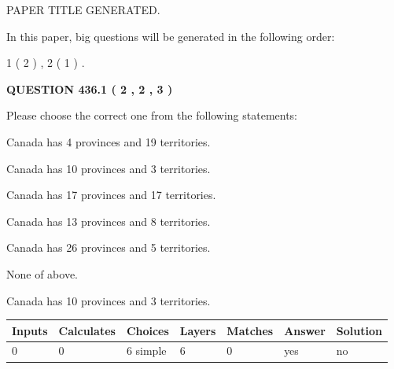 \documentclass[12pt]{article}
\begin{document}
   
\vspace{0.2in}
   
   
   
   
   
   
   
   
 \vspace{0.2in}
 
 
 
 
   
   
 PAPER TITLE GENERATED.
   
   
   
\vspace{0.2in}
   
In this paper, big questions will be generated in the following order: 
   
   
   1 ( 2 )
 ,
   2 ( 1 )
 .
  
\vspace{0.2in}
  
{\textbf{\Large{QUESTION
436.1 
 ( 2 , 2 , 3 )
}}}
  
  
Please choose the correct one from the following statements:
 
 
Canada has   4 provinces and  19 territories.
 
 
Canada has 10  provinces and 3 territories.
 
 
Canada has  17 provinces and  17 territories.
 
 
Canada has  13 provinces and  8 territories.
 
 
Canada has  26 provinces and  5 territories.
 
 
 None of above.
 
 
\noindent{}
 
 
Canada has 10  provinces and 3 territories.
 
 
\noindent{}
 
 
   
   
   
   
\noindent\begin{tabular}{|l|l|l|l|l|l|l|}
 \hline
Inputs & Calculates & Choices & Layers & Matches & Answer & Solution \\ \hline
 0  & 
 0  & 
 6
  simple  
  & 
 6  & 
 0  & 
  yes & 
  no 
  \\ \hline
 \end{tabular}
   
\end{document}
